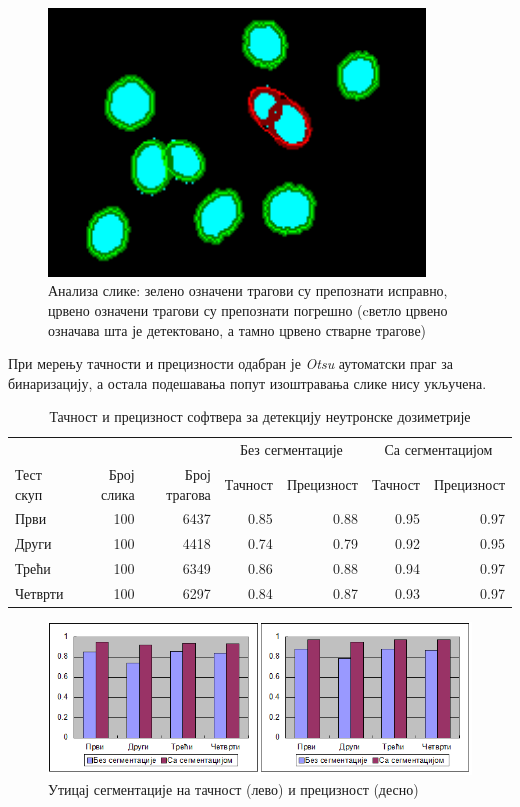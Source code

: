 \documentclass[11pt,a4paper,serbian,oneside]{book}
\begin{document}
\begin{figure}[H]
\begin{center}
\includegraphics[width=100mm]{images/analysis.png}
\end{center}
\caption{Анализа слике: зелено означени трагови су препознати исправно, црвено означени трагови су препознати погрешно (cветло црвено означава шта је детектовано, а тамно црвено стварне трагове) }
\label{fig:analysis}
\end{figure}

При мерењу тачности и прецизности одабран је \textit{Otsu} аутоматски праг за бинаризацију, а остала подешавања попут изоштравања слике нису укључена.

\begin{table}[H]
\centering%
\caption{Тачност и прецизност софтвера за детекцију неутронске дозиметрије}
\begin{tabular}{lrrrrrr}
\hline
& & & \multicolumn{2}{c}{Без сегментације} & \multicolumn{2}{c}{Са сегментацијом} \\
Тест скуп & Број слика & Број трагова & Тачност & Прецизност & Тачност &  Прецизност \\
\hline
Први & 100 & 6437 & 0.85 & 0.88 & 0.95 & 0.97 \\
Други & 100 & 4418 & 0.74 & 0.79 & 0.92 & 0.95 \\
Трећи & 100 & 6349 & 0.86 & 0.88 & 0.94 & 0.97 \\
Четврти & 100 & 6297 & 0.84 & 0.87 & 0.93 & 0.97 \\
\hline
\end{tabular}
\label{tab:metrics}
\end{table} 

\begin{figure}[H]
\begin{center}
\includegraphics[width=150mm]{images/segmentation_results.png}
\end{center}
\caption{Утицај сегментације на тачност (лево) и прецизност (десно)}
\label{fig:seginf}
\end{figure}
\end{document}
